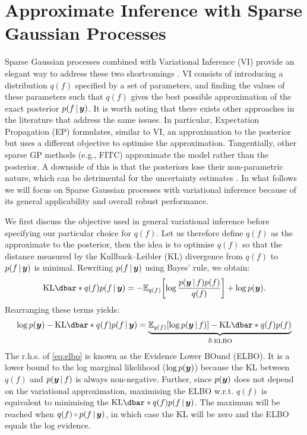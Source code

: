 \section{Approximate Inference with Sparse Gaussian Processes}

Sparse Gaussian processes combined with Variational Inference (VI) provide an elegant way to address these two shortcomings \citep{titsias2009, hensman2013, hensman2015scalable}. VI consists of introducing a distribution $q(f)$ specified by a set of parameters, and finding the values of these parameters such that $q(f)$ gives the best possible approximation of the exact posterior $p(f \,|\, \bm{y} )$. It is worth noting that there exists other approaches in the literature that address the same issues. In particular, Expectation Propagation (EP) \citep{minka2001expectation,bui2017unifying} formulates, similar to VI, an approximation to the posterior but uses a different objective to optimise the approximation. Tangentially, other sparse GP methods (e.g., FITC) \citep{Snelson05,quinonero2005unifying} approximate the model rather than the posterior. A downside of this is that the posteriors lose their non-parametric nature, which can be detrimental for the uncertainty estimates \citep{bauer2016understanding}. In what follows we will focus on Sparse Gaussian processes with variational inference because of its general applicability and overall robust performance.

We first discuss the objective used in general variational inference before specifying our particular choice for $q(f)$. Let us therefore define $q(f)$ as the approximate to the posterior, then the idea is to optimise $q(f)$ so that the distance measured by the Kullback–Leibler (KL) divergence from $q(f)$ to $p(f \,|\, \bm{y})$ is minimal. Rewriting $p(f \,|\, \bm{y})$ using Bayes' rule, we obtain:
\begin{equation}
  \KL{q(f)}{p(f \given \vy)} = -{\Exp{q(f)}{\log \frac{p(\vy \given f) p(f)}{q(f)}}} + \log p(\vy).
\end{equation}
Rearranging these terms yields:
\begin{equation}
  \label{eq:elbo}
  \log p(\vy) - \KL{q(f)}{p(f \given \vy)} = 
  \underbrace{\Exp{q(f)}{\log p(\vy \given f)} - \KL{q(f)}{p(f)}}_{\triangleq\,\textrm{ELBO}}
\end{equation}
The r.h.s. of \cref{eq:elbo} is known as the Evidence Lower BOund (ELBO). It is a lower bound to the log marginal likelihood ($\log p(\bm{y})$) because the KL between $q(f)$ and $p(\bm{y} \,|\, f)$ is always non-negative. Further, since $p(\bm{y})$ does not depend on the variational approximation, maximising the ELBO w.r.t. $q(f)$ is equivalent to minimising the $\KL{q(f)}{p(f \given \vy)}$. The maximum will be reached when $q(f) \shorteq p(f \given \vy)$, in which case the KL will be zero and the ELBO equals the log evidence. 

